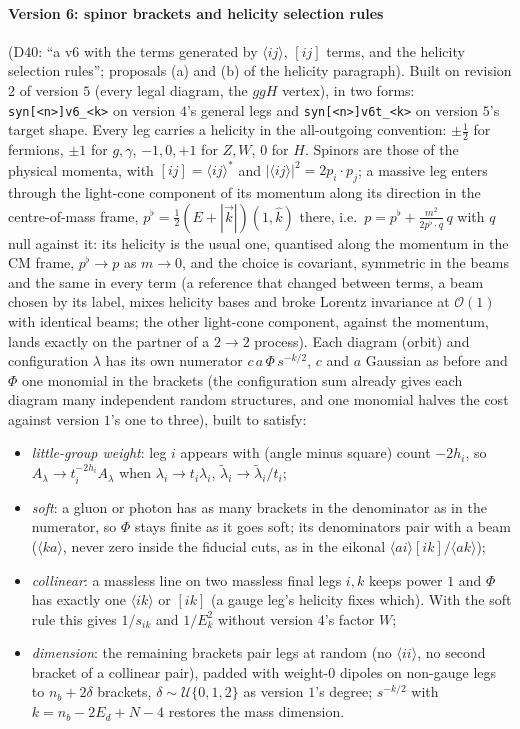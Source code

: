 \documentclass[11pt]{article}
\newcommand{\code}[1]{\texttt{#1}}
\begin{document}
\paragraph{Version 6: spinor brackets and helicity selection rules} (D40: ``a v6 with the terms generated by $\langle
ij\rangle$, $[ij]$ terms, and the helicity selection rules''; proposals (a) and (b) of the helicity paragraph). Built on
revision $2$ of version $5$ (every legal diagram, the $ggH$ vertex), in two forms: \code{syn[<n>]v6\_<k>} on version
$4$'s general legs and \code{syn[<n>]v6t\_<k>} on version $5$'s target shape. Every leg carries a helicity in the
all-outgoing convention: $\pm\tfrac12$ for fermions, $\pm1$ for $g,\gamma$, $-1,0,+1$ for $Z,W$, $0$ for $H$. Spinors
are those of the physical momenta, with $[ij]=\langle ij\rangle^*$ and $|\langle ij\rangle|^2=2p_i\!\cdot\!p_j$; a
massive leg enters through the light-cone component of its momentum along its direction in the centre-of-mass frame,
$p^\flat=\tfrac12(E+|\vec k|)(1,\hat k)$ there, i.e.\ $p=p^\flat+\frac{m^2}{2p^\flat\cdot q}\,q$ with $q$ null against it:
its helicity is the usual one, quantised along the momentum in the CM frame, $p^\flat\to p$ as $m\to0$, and the
choice is covariant, symmetric in the beams and the same in every term (a reference that changed between terms, a beam
chosen by its label, mixes helicity bases and broke Lorentz invariance at $\mathcal O(1)$ with identical beams; the
other light-cone component, against the momentum, lands exactly on the partner of a $2\to2$ process). Each diagram
(orbit) and configuration $\lambda$ has its own numerator $c\,a\,\Phi\,s^{-k/2}$, $c$ and $a$ Gaussian as before and
$\Phi$ one monomial in the brackets (the configuration sum already gives each diagram many independent random
structures, and one monomial halves the cost against version $1$'s one to three), built to satisfy:
\begin{itemize}
  \item \emph{little-group weight}: leg $i$ appears with (angle minus square) count $-2h_i$, so
    $A_\lambda\to t_i^{-2h_i}A_\lambda$ when $\lambda_i\to t_i\lambda_i$, $\tilde\lambda_i\to\tilde\lambda_i/t_i$;
  \item \emph{soft}: a gluon or photon has as many brackets in the denominator as in the numerator, so $\Phi$ stays
    finite as it goes soft; its denominators pair with a beam ($\langle ka\rangle$, never zero inside the fiducial
    cuts, as in the eikonal $\langle ai\rangle[ik]/\langle ak\rangle$);
  \item \emph{collinear}: a massless line on two massless final legs $i,k$ keeps power $1$ and $\Phi$ has exactly one
    $\langle ik\rangle$ or $[ik]$ (a gauge leg's helicity fixes which). With the soft rule this gives $1/s_{ik}$ and
    $1/E_k^2$ without version $4$'s factor $W$;
  \item \emph{dimension}: the remaining brackets pair legs at random (no $\langle ii\rangle$, no second bracket of a
    collinear pair), padded with weight-$0$ dipoles on non-gauge legs to $n_b+2\delta$ brackets, $\delta\sim\mathcal
    U\{0,1,2\}$ as version $1$'s degree; $s^{-k/2}$ with $k=n_b-2E_d+N-4$ restores the mass dimension.
\end{itemize}
\end{document}
